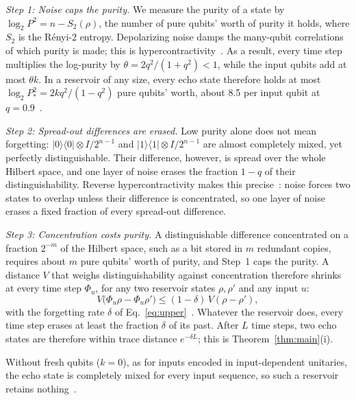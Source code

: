 \documentclass[aps,prl,twocolumn,superscriptaddress,floatfix]{revtex4-2}
\theoremstyle{plain}
\newcommand{\ketbra}[2]{|#1\rangle\!\langle #2|}
\begin{document}
\emph{Step 1: Noise caps the purity.} We measure the purity of a state by $\log_2P^2=n-S_2(\rho)$, the number of pure qubits' worth of purity it holds, where $S_2$ is the R\'enyi-2 entropy. Depolarizing noise damps the many-qubit correlations of which purity is made; this is hypercontractivity~\cite{King2014}. As a result, every time step multiplies the log-purity by $\theta=2q^2/(1+q^2)<1$, while the input qubits add at most $\theta k$. In a reservoir of any size, every echo state therefore holds at most $\log_2P_*^2=2kq^2/(1-q^2)$ pure qubits' worth, about 8.5 per input qubit at $q=0.9$~\cite[Sec.~III\,B]{SM}.

\emph{Step 2: Spread-out differences are erased.} Low purity alone does not mean forgetting: $\ketbra00\otimes I/2^{n-1}$ and $\ketbra11\otimes I/2^{n-1}$ are almost completely mixed, yet perfectly distinguishable. Their difference, however, is spread over the whole Hilbert space, and one layer of noise erases the fraction $1-q$ of their distinguishability. Reverse hypercontractivity makes this precise~\cite{Cubitt2015}: noise forces two states to overlap unless their difference is concentrated, so one layer of noise erases a fixed fraction of every spread-out difference.

\emph{Step 3: Concentration costs purity.} A distinguishable difference concentrated on a fraction $2^{-m}$ of the Hilbert space, such as a bit stored in $m$ redundant copies, requires about $m$ pure qubits' worth of purity, and Step~1 caps the purity. A distance $V$ that weighs distinguishability against concentration therefore shrinks at every time step $\Phi_u$, for any two reservoir states $\rho,\rho'$ and any input $u$:
\begin{equation}
V\bigl(\Phi_u\rho-\Phi_u\rho'\bigr)\le(1-\delta)\,V(\rho-\rho'),
\label{eq:contraction}
\end{equation}
with the forgetting rate $\delta$ of Eq.~\eqref{eq:upper}~\cite[Secs.~III\,D--E]{SM}. Whatever the reservoir does, every time step erases at least the fraction $\delta$ of its past. After $L$ time steps, two echo states are therefore within trace distance $e^{-\delta L}$; this is Theorem~\ref{thm:main}(i).

Without fresh qubits ($k=0$), as for inputs encoded in input-dependent unitaries, the echo state is completely mixed for every input sequence, so such a reservoir retains nothing~\citetext{\citealp{Aharonov1996}; \citealp[Sec.~III\,F]{SM}}.
\end{document}
